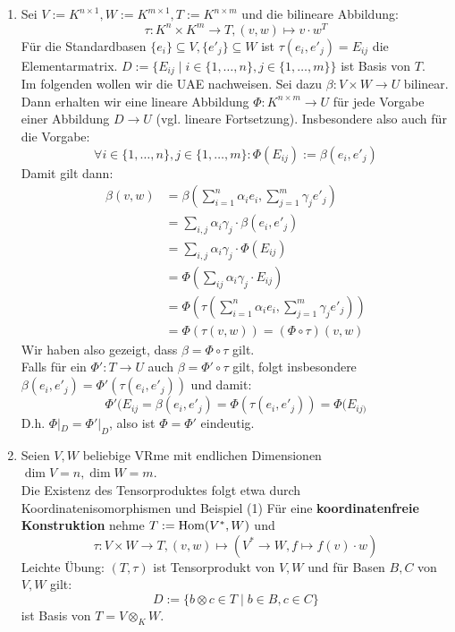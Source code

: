 \documentclass[parskip,a4paper,twoside,DIV15,BCOR12mm]{scrbook}
\begin{document}
\begin{example}
\begin{enumerate}
\item Sei $V:=K^{n\times 1},W:=K^{m\times 1}, T:=K^{n\times m}$ und die bilineare
Abbildung:
\[\tau:K^n\times K^m\to T,(v,w)\mapsto v\cdot w^T\]
Für die Standardbasen $\{e_i\}\subseteq V,\{e'_j\}\subseteq W$ ist $\tau(e_i,e'_j)=E_{ij}$
die Elementarmatrix. $D:=\{E_{ij}\mid i\in\{1,\ldots,n\},j\in\{1,\ldots,m\}\}$ ist
Basis von $T$.\\
Im folgenden wollen wir die UAE nachweisen. Sei dazu $\beta:V\times W\to U$ bilinear.
Dann erhalten wir eine lineare Abbildung $\Phi:K^{n\times m}\to U$ für jede Vorgabe einer
Abbildung $D\to U$ (vgl. lineare Fortsetzung). Insbesondere also auch für die Vorgabe:
\[\forall i\in\{1,\ldots,n\},j\in\{1,\ldots,m\}:\Phi(E_{ij}):=\beta(e_i,e'_j)\]
Damit gilt dann:
\begin{align*}
\beta(v,w)&=\beta\left(\sum_{i=1}^n \alpha_i e_i,\sum_{j=1}^m \gamma_j e'_j\right)\\
&=\sum_{i,j}\alpha_i\gamma_j\cdot\beta(e_i,e'_j)\\
&=\sum_{i,j}\alpha_i\gamma_j\cdot\Phi(E_{ij})\\
&=\Phi\left(\sum_{ij}\alpha_i\gamma_j\cdot E_{ij}\right)\\
&=\Phi\left(\tau\left(\sum_{i=1}^n\alpha_i e_i,\sum_{j=1}^m \gamma_j e'_j\right)\right)\\
&=\Phi(\tau(v,w))=(\Phi\circ\tau)(v,w)
\end{align*}
Wir haben also gezeigt, dass $\beta=\Phi\circ\tau$ gilt.\\
Falls für ein $\Phi':T\to U$ auch $\beta=\Phi'\circ\tau$ gilt, folgt insbesondere
$\beta(e_i,e'_j)=\Phi'(\tau(e_i,e'_j))$ und damit:
\[\Phi'(E_{ij}=\beta(e_i,e'_j)=\Phi(\tau(e_i,e'_j))=\Phi(E_{ij)}\]
D.h. $\Phi|_D=\Phi'|_D$, also ist $\Phi=\Phi'$ eindeutig.
\item Seien $V,W$ beliebige VRme mit endlichen Dimensionen $\dim V=n,\dim W=m$.\\
Die Existenz des Tensorproduktes folgt etwa durch Koordinatenisomorphismen und
Beispiel (1) Für eine \textbf{koordinatenfreie Konstruktion} nehme $T:=\operatorname{Hom}(V^*,W)$ und
\[\tau:V\times W\to T,(v,w)\mapsto(V^*\to W,f\mapsto f(v)\cdot w)\]
Leichte Übung: $(T,\tau)$ ist Tensorprodukt von $V,W$ und für Basen $B,C$ von $V,W$ gilt:
\[D:=\{b\otimes c\in T\mid b\in B,c\in C\}\]
ist Basis von $T=V\otimes_K W$.
\end{enumerate}
\end{example}
\end{document}
